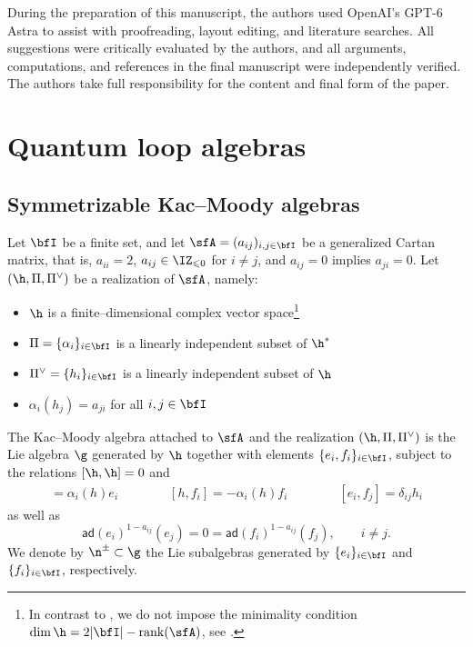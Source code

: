 \documentclass[reqno]{amsart}
\newcommand{\nc}{\newcommand}
\numberwithin{equation}{section}
\begin{document}
During the preparation of this manuscript, the authors used OpenAI’s GPT-6 Astra to 
assist with proofreading, layout editing, and literature searches.
All suggestions were critically evaluated by the authors, and all arguments, computations, and references in the final manuscript were independently verified. The authors take full responsibility for the content and final form of the paper.
	

\section{Quantum loop algebras}\label{s:QL}

\subsection{Symmetrizable Kac--Moody algebras \cite{kac-90}}\label{ss:sym-km-summary}

\nc{\crt}[1]{h_{#1}}
\nc{\drc}[1]{\delta_{#1}}
\nc{\symd}[1]{d_{#1}}
\nc{\symdi}[1]{d_{#1}^{-1}}
\nc{\iip}[2]{\langle#1,#2\rangle}
\nc{\Diag}{\operatorname{diag}}
\nc{\rt}[1]{\alpha_{#1}}
\nc{\tinv}[1]{t_{#1}}

Let $\bfI$ be a finite set, and let $\sfA=(a_{ij})_{i,j\in\bfI}$ be a generalized Cartan matrix, that is,
$a_{ii}=2$, $a_{ij}\in\IZ_{\leqslant 0}$ for $i\neq j$, and $a_{ij}=0$ implies $a_{ji}=0$.
Let $(\h,\Pi,\Pi^\vee)$ be a realization of $\sfA$, namely:
\begin{itemize}[leftmargin=1.5em]\itemsep0.25cm
	\item $\h$ is a finite--dimensional complex vector space\footnote{In contrast to \cite{kac-90}, we do not impose the minimality condition $\dim \h = 2|\bfI|-\operatorname{rank}(\sfA)$, see \cite[Sec.~11]{appel-toledano-19b}.}
	\item $\Pi=\{\alpha_i\}_{i\in\bfI}$ is a linearly independent subset of $\h^*$
	\item $\Pi^\vee=\{\crt{i}\}_{i\in\bfI}$ is a linearly independent subset of $\h$
	\item $\alpha_i(\crt{j})=a_{ji}$ for all $i,j\in\bfI$
\end{itemize}
The Kac--Moody algebra attached to $\sfA$ and the realization $(\h,\Pi,\Pi^\vee)$ is the Lie algebra $\g$
generated by $\h$ together with elements $\{e_i,f_i\}_{i\in\bfI}$, subject to the relations $[\h,\h]=0$ and
\begin{gather}
	[h,e_i]=\alpha_i(h)e_i
	\qquad\qquad
	[h,f_i]=-\alpha_i(h)f_i
	\qquad\qquad
	[e_i,f_j]=\drc{ij}\crt{i}
\end{gather}
as well as
\[
\mathsf{ad}(e_i)^{1-a_{ij}}(e_j)=0=\mathsf{ad}(f_i)^{1-a_{ij}}(f_j),
\qquad i\neq j.
\]
We denote by $\n^\pm\subset\g$ the Lie subalgebras generated by $\{e_i\}_{i\in\bfI}$ and
$\{f_i\}_{i\in\bfI}$, respectively.\\
\end{document}
